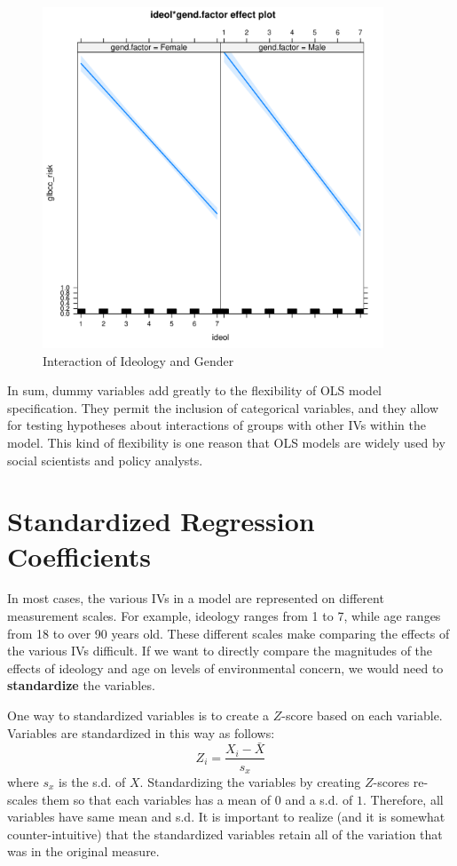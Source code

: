 \documentclass[11pt,openany]{book}
\begin{document}
\begin{figure}
  \centering
  \includegraphics[width=4in]{../14_Topics/dummales.pdf}%
  \caption {Interaction of Ideology and Gender \label{fig:dummales}}
\end{figure}


In sum, dummy variables add greatly to the flexibility of OLS model specification. They permit the inclusion of categorical variables, and they allow for testing hypotheses about interactions  of groups with other IVs within the model. This kind of flexibility is one reason that OLS models are widely used by social scientists and policy analysts.

\section{Standardized Regression Coefficients} 

In most cases, the various IVs in a model are represented on different measurement scales. For example, ideology ranges from 1 to 7, while age ranges from 18 to over 90 years old. These different scales make comparing the effects of the various IVs difficult.  If we want to directly compare the magnitudes of the effects of ideology and age on levels of environmental concern, we would need to \textbf{standardize} the variables. 

One way to standardized variables is to create a $Z$-score based on each variable. Variables are standardized in this way as follows:
\begin{equation}
  Z_i = \frac{X_i-\bar{X}}{s_x} 
\end{equation}
\noindent where $s_x$ is the s.d. of $X$. Standardizing the variables by creating $Z$-scores re-scales them so that each variables has a mean of $0$ and a s.d. of $1$. Therefore, all variables have same mean and s.d. It is important to realize (and it is somewhat counter-intuitive) that the standardized variables retain all of the variation that was in the original measure.
\end{document}
